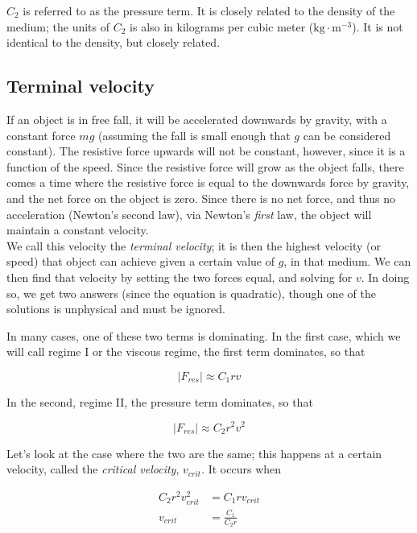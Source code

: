 \documentclass[12pt,a4paper]{report}
\begin{document}
$C_2$ is referred to as the pressure term. It is closely related to the density of the medium; the units of $C_2$ is also in kilograms per cubic meter ($\text{kg} \cdot \text{m}^{-3}$). It is not identical to the density, but closely related.

\subsection{Terminal velocity}

If an object is in free fall, it will be accelerated downwards by gravity, with a constant force $m g$ (assuming the fall is small enough that $g$ can be considered constant). The resistive force upwards will not be constant, however, since it is a function of the speed. Since the resistive force will grow as the object falls, there comes a time where the resistive force is equal to the downwards force by gravity, and the net force on the object is zero. Since there is no net force, and thus no acceleration (Newton's second law), via Newton's \emph{first} law, the object will maintain a constant velocity.\\
We call this velocity the \emph{terminal velocity}; it is then the highest velocity (or speed) that object can achieve given a certain value of $g$, in that medium. We can then find that velocity by setting the two forces equal, and solving for $v$. In doing so, we get two answers (since the equation is quadratic), though one of the solutions is unphysical and must be ignored.

In many cases, one of these two terms is dominating. In the first case, which we will call regime I or the viscous regime, the first term dominates, so that

\begin{equation}
|F_{res}| \approx C_1 r v
\end{equation}

In the second, regime II, the pressure term dominates, so that

\begin{equation}
|F_{res}| \approx C_2 r^2 v^2
\end{equation}

Let's look at the case where the two are the same; this happens at a certain velocity, called the \emph{critical velocity}, $v_{crit}$. It occurs when

\begin{align}
C_2 r^2 v_{crit}^2 &= C_1 r v_{crit}\\
v_{crit} &= \frac{C_1}{C_2 r}
\end{align}
\end{document}
